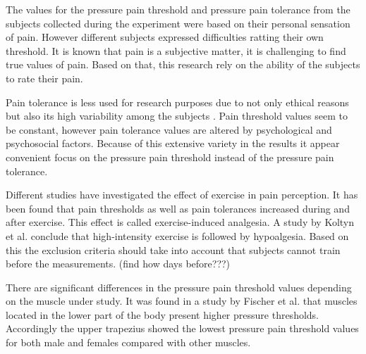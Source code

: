 The values for the pressure pain threshold and pressure pain tolerance from the subjects collected during the experiment were based on their personal sensation of pain. However different subjects expressed difficulties ratting their own threshold. It is known that pain is a subjective matter, it is challenging to find true values of pain. Based on that, this research rely on the ability of the subjects to rate their pain.

Pain tolerance is less used for research purposes due to not only  ethical reasons but also its high variability among the subjects \cite{Yarnitsky2006}. Pain threshold values seem to be constant, however pain tolerance values are altered by psychological and psychosocial factors. Because of this extensive variety in the results it appear convenient focus on the pressure pain threshold instead of the pressure pain tolerance. 

Different studies have investigated the effect of exercise in pain perception. It has been found that pain thresholds as well as pain tolerances increased during and after exercise. This effect is called exercise-induced analgesia. A study by Koltyn et al. \cite{Koltyn2002} conclude that high-intensity exercise is followed by hypoalgesia. Based on this the exclusion criteria should take into account that subjects cannot train before the measurements. (find how days before???) 

There are significant differences in the pressure pain threshold values depending on the  muscle under study. It was found in a study by Fischer et al. \cite{Fischer1987} that muscles located in the lower part of the body present  higher pressure thresholds. Accordingly the upper trapezius showed the lowest pressure pain threshold values for both male and females compared with other muscles.

